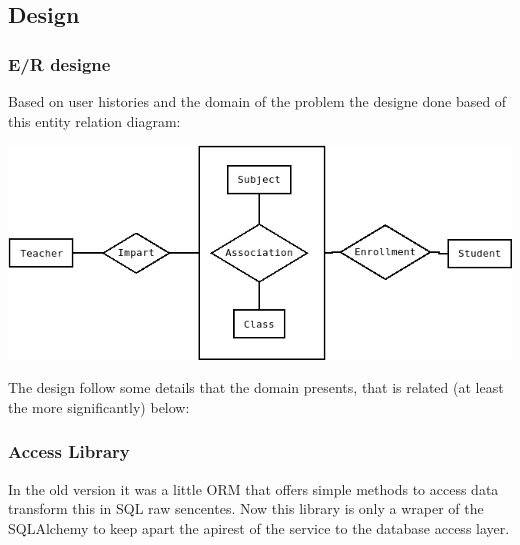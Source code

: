 \documentclass[oneside,english,titlepage]{scrbook}
\begin{document}
\noindent{}

\bigskip

\noindent{}

\subsection{Design}

\subsubsection{E/R designe}

Based on user histories and the domain of the problem the designe
done based of this entity relation diagram:

\includegraphics[scale=0.5]{img/diagrams/dbms-ER}

The design follow some details that the domain presents, that is related
(at least the more significantly) below:

\subsubsection{Access Library}

In the old version it was a little ORM that offers simple methods
to access data transform this in SQL raw sencentes. Now this library
is only a wraper of the SQLAlchemy to keep apart the apirest of the
service to the database access layer.
\end{document}
